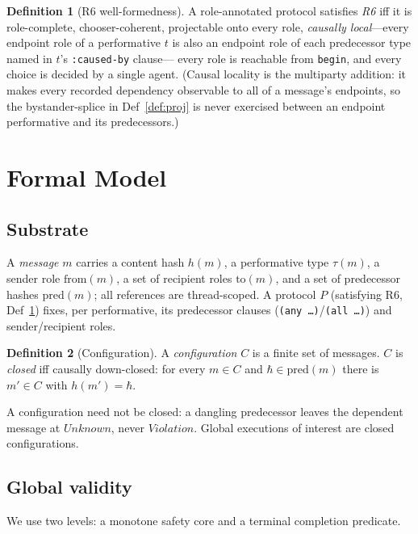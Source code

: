 \documentclass[11pt]{article}
\newcommand{\code}[1]{\texttt{#1}}
\newcommand{\caused}{\code{:caused-by}}
\theoremstyle{definition}
\newtheorem{definition}{Definition}
\theoremstyle{plain}
\begin{document}
\begin{definition}[R6 well-formedness]
\label{def:r6}
A role-annotated protocol satisfies \emph{R6} iff it is role-complete, chooser-coherent,
projectable onto every role, \emph{causally local}---every endpoint role of a performative
$t$ is also an endpoint role of each predecessor type named in $t$'s \caused{} clause---%
every role is reachable from \code{begin}, and every choice is decided by a single agent.
(Causal locality is the multiparty addition: it makes every recorded dependency observable
to all of a message's endpoints, so the bystander-splice in Def~\ref{def:proj} is never
exercised between an endpoint performative and its predecessors.)
\end{definition}

\section{Formal Model}
\label{sec:model}

\subsection{Substrate}
A \emph{message} $m$ carries a content hash $h(m)$, a performative type $\tau(m)$, a
sender role $\mathrm{from}(m)$, a set of recipient roles $\mathrm{to}(m)$, and a set of
predecessor hashes $\mathrm{pred}(m)$; all references are thread-scoped.
A protocol $P$ (satisfying R6, Def~\ref{def:r6}) fixes, per performative, its predecessor
clauses (\code{(any \ldots)}/\code{(all \ldots)}) and sender/recipient roles.

\begin{definition}[Configuration]
\label{def:config}
A \emph{configuration} $C$ is a finite set of messages.
$C$ is \emph{closed} iff causally down-closed: for every $m\in C$ and
$\hbar\in\mathrm{pred}(m)$ there is $m'\in C$ with $h(m')=\hbar$.
\end{definition}

A configuration need not be closed: a dangling predecessor leaves the dependent message
at $\mathit{Unknown}$, never $\mathit{Violation}$.
Global executions of interest are closed configurations.

\subsection{Global validity}
We use two levels: a monotone safety core and a terminal completion predicate.
\end{document}
